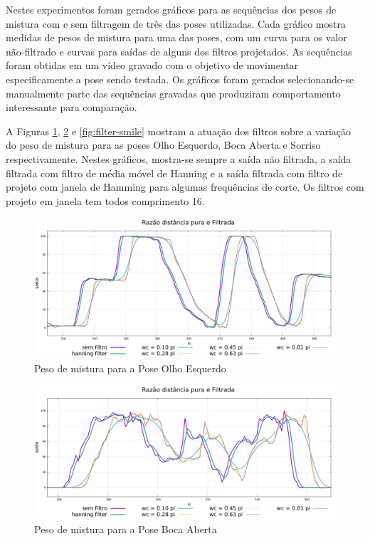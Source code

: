Nestes experimentos foram gerados gráficos para as sequências dos pesos de mistura com e sem filtragem de três das poses utilizadas. Cada gráfico mostra medidas de pesos de mistura para uma das poses, com um curva para os valor não-filtrado e curvas para saídas de alguns dos filtros projetados.  As sequências foram obtidas em um vídeo gravado com o objetivo de movimentar especificamente a pose sendo testada. Os gráficos foram gerados selecionando-se manualmente parte das sequências gravadas que produziram comportamento interessante para comparação.

A Figuras \ref{fig:filter-left-eye}, \ref{fig:filter-open-mouth} e \ref{fig:filter-smile} mostram a atuação dos filtros sobre a variação do peso de mistura para as poses Olho Esquerdo, Boca Aberta e Sorriso respectivamente. Nestes gráficos, mostra-se sempre a saída não filtrada, a saída filtrada com filtro de média móvel de Hanning e a saída filtrada com filtro de projeto com janela de Hamming para algumas frequências de corte. Os filtros com projeto em janela tem todos comprimento 16.

\begin{figure}[!htb]
\centering
\includegraphics[width=1.0\textwidth]{figs/filter-result-open-mouth.pdf} 
\caption{Peso de mistura para a Pose Olho Esquerdo}
\label{fig:filter-left-eye}
\end{figure}

\begin{figure}[!htb]
\centering
\includegraphics[width=1.0\textwidth]{figs/filter-result-left-eye.pdf} 
\caption{Peso de mistura para a Pose Boca Aberta}
\label{fig:filter-open-mouth}
\end{figure}

